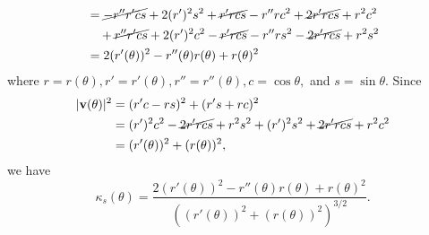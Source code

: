 \documentclass{homework}
\begin{document}
{\begin{align*}
    \\ &\quad =\cancel{-r''r'cs}+2(r')^2s^2+\cancel{r'rcs} - r''rc^2 + \cancel{2r'rcs} + r^2c^2 
    \\ &\qquad + \cancel{r''r'cs} + 2(r')^2 c^2 - \cancel{r'rcs} - r''rs^2 - \cancel{2r'rcs} + r^2s^2
    \\ &\quad =  2(r'(\theta))^2 - r''(\theta)r(\theta) + r(\theta)^2
  \end{align*}
  where $r=r(\theta), r'=r'(\theta), r''=r''(\theta), c=\cos\theta,$ and $s=\sin\theta$.
  Since 
  \begin{align*}
    |\mathbf v(\theta)|^2 &= (r'c - rs)^2 + (r's+rc)^2 
    \\&= (r')^2c^2 -\cancel{ 2r'rcs} + r^2s^2 + (r')^2s^2 + \cancel{2r'rcs} + r^2c^2
    \\&= (r'(\theta))^2 + (r(\theta))^2, 
  \end{align*}
  we have
  $$\kappa_s(\theta) = \frac{2(r'(\theta))^2 - r''(\theta)r(\theta) + r(\theta)^2}{((r'(\theta))^2 + (r(\theta))^2)^{3/2}}. $$
}
\end{document}
